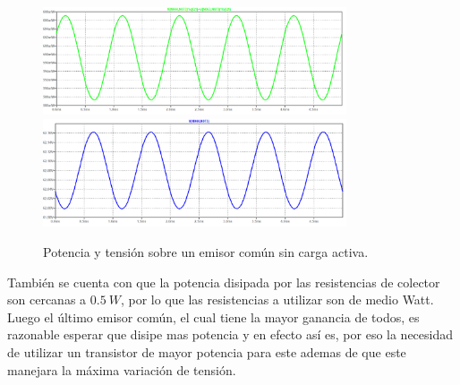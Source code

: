 \begin{figure}[H]
	\centering
	\includegraphics[width=0.8\textwidth]{ImagenesSimulaciones/PEC1.png}
		\includegraphics[width=0.8\textwidth]{ImagenesSimulaciones/VEC1.png}
	\caption{Potencia y tensión sobre un emisor común sin carga activa.}
	\label{fig:pec1}
\end{figure}

También se cuenta con que la potencia disipada por las resistencias de colector son cercanas a $0.5 \ W$, por lo que las resistencias a utilizar son de medio Watt. Luego el último emisor común, el cual tiene la mayor ganancia de todos, es razonable esperar que disipe mas potencia y en efecto así es, por eso la necesidad de utilizar un transistor de mayor potencia para este ademas de que este manejara la máxima variación de tensión.

